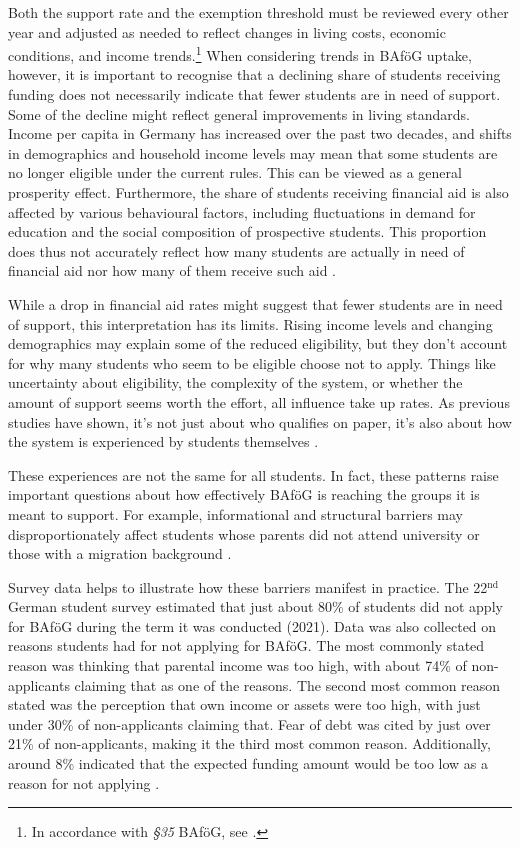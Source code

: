 Both the support rate and the exemption threshold must be reviewed every other year and adjusted as needed to reflect changes in living costs, economic conditions, and income trends.\footnote{
    In accordance with \textit{§35} BAföG, see \cite{bafoeg_law}.
}
When considering trends in BAföG uptake, however, it is important to recognise that a declining share of students receiving funding does not necessarily indicate that fewer students are in need of support. 
Some of the decline might reflect general improvements in living standards. 
Income per capita in Germany has increased over the past two decades, and shifts in demographics and household income levels may mean that some students are no longer eligible under the current rules. 
This can be viewed as a general prosperity effect. 
Furthermore, the share of students receiving financial aid is also affected by various behavioural factors, including fluctuations in demand for education and the social composition of prospective students. 
This proportion does thus not accurately reflect how many students are actually in need of financial aid nor how many of them receive such aid \citep{meier_bafog_2024, meier_zur_2024}.

While a drop in financial aid rates might suggest that fewer students are in need of support, this interpretation has its limits. Rising income levels and changing demographics may explain some of the reduced eligibility, but they don't account for why many students who seem to be eligible choose not to apply. Things like uncertainty about eligibility, the complexity of the system, or whether the amount of support seems worth the effort, all influence take up rates. As previous studies have shown, it’s not just about who qualifies on paper, it’s also about how the system is experienced by students themselves \citep{meier_bafog_2024, meier_zur_2024}.

These experiences are not the same for all students. In fact, these patterns raise important questions about how effectively BAföG is reaching the groups it is meant to support. For example, informational and structural barriers may disproportionately affect students whose parents did not attend university or those with a migration background \citep{kroher_studierendenbefragung_2023}.

Survey data helps to illustrate how these barriers manifest in practice. The 22\( ^\text{nd} \) German student survey estimated that just about 80\% of students did not apply for BAföG during the term it was conducted (2021). Data was also collected on reasons students had for not applying for BAföG. The most commonly stated reason was thinking that parental income was too high, with about 74\% of non-applicants claiming that as one of the reasons. The second most common reason stated was the perception that own income or assets were too high, with just under 30\% of non-applicants claiming that. Fear of debt was cited by just over 21\% of non-applicants, making it the third most common reason. Additionally, around 8\% indicated that the expected funding amount would be too low as a reason for not applying \citep{kroher_studierendenbefragung_2023}.

